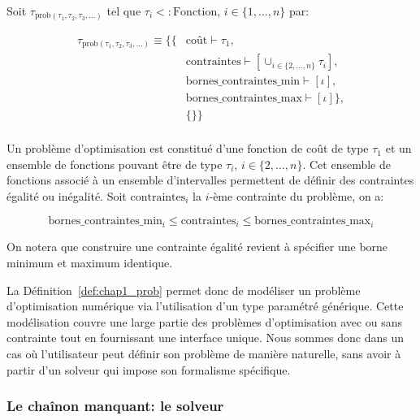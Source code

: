 \begin{mydef}\label{def:chap1_prob}
  Soit $\tau_{\text{prob}(\tau_1, \tau_2, \tau_3, \dotsc)}$ tel que
  $\tau_i <: \text{Fonction}$, $i \in \{1, \dotsc, n\}$ par:

  \begin{equation}
  \begin{split}
    \tau_{\text{prob}(\tau_1, \tau_2, \tau_3, \dotsc)} \equiv
    \{ \{ & \text{coût} \vdash \tau_1,\\
    & \text{contraintes} \vdash [\cup_{i \in \{2, \dotsc, n\}} \tau_i],\\
    & \text{bornes\_contraintes\_min} \vdash [\iota], \\
    & \text{bornes\_contraintes\_max} \vdash [\iota] \},\\
    & \{ \} \}\\
  \end{split}
  \end{equation}

  Un problème d'optimisation est constitué d'une fonction de coût de
  type $\tau_1$ et un ensemble de fonctions pouvant être de type
  $\tau_i$, $i \in \{2, \dotsc, n\}$. Cet ensemble de fonctions
  associé à un ensemble d'intervalles permettent de définir des
  contraintes égalité ou inégalité. Soit $\text{contraintes}_i$ la
  $i$-ème contrainte du problème, on a:

  \begin{equation}
    \text{bornes\_contraintes\_min}_i \leq \text{contraintes}_i \leq
    \text{bornes\_contraintes\_max}_i
  \end{equation}

  On notera que construire une contrainte égalité revient à spécifier
  une borne minimum et maximum identique.
\end{mydef}


La Définition~\ref{def:chap1_prob} permet donc de modéliser un
problème d'optimisation numérique via l'utilisation d'un type
paramétré générique. Cette modélisation couvre une large partie des
problèmes d'optimisation avec ou sans contrainte tout en fournissant
une interface unique. Nous sommes donc dans un cas où l'utilisateur
peut définir son problème de manière naturelle, sans avoir à partir
d'un solveur qui impose son formalisme spécifique.


\subsubsection{Le chaînon manquant: le solveur}


